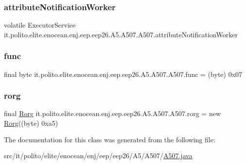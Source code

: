 \subsubsection{\texorpdfstring{attribute\+Notification\+Worker}{attributeNotificationWorker}}
{\footnotesize\ttfamily volatile Executor\+Service it.\+polito.\+elite.\+enocean.\+enj.\+eep.\+eep26.\+A5.\+A507.\+A507.\+attribute\+Notification\+Worker\hspace{0.3cm}{\ttfamily [protected]}}

\hypertarget{classit_1_1polito_1_1elite_1_1enocean_1_1enj_1_1eep_1_1eep26_1_1_a5_1_1_a507_1_1_a507_a2ce5037e955bdc5cf02e51052dd0558d}{}\label{classit_1_1polito_1_1elite_1_1enocean_1_1enj_1_1eep_1_1eep26_1_1_a5_1_1_a507_1_1_a507_a2ce5037e955bdc5cf02e51052dd0558d} 
\subsubsection{\texorpdfstring{func}{func}}
{\footnotesize\ttfamily final byte it.\+polito.\+elite.\+enocean.\+enj.\+eep.\+eep26.\+A5.\+A507.\+A507.\+func = (byte) 0x07\hspace{0.3cm}{\ttfamily [static]}}

\hypertarget{classit_1_1polito_1_1elite_1_1enocean_1_1enj_1_1eep_1_1eep26_1_1_a5_1_1_a507_1_1_a507_a3aa5eb97264c67f46176f7462ef591c0}{}\label{classit_1_1polito_1_1elite_1_1enocean_1_1enj_1_1eep_1_1eep26_1_1_a5_1_1_a507_1_1_a507_a3aa5eb97264c67f46176f7462ef591c0} 
\subsubsection{\texorpdfstring{rorg}{rorg}}
{\footnotesize\ttfamily final \hyperlink{classit_1_1polito_1_1elite_1_1enocean_1_1enj_1_1eep_1_1_rorg}{Rorg} it.\+polito.\+elite.\+enocean.\+enj.\+eep.\+eep26.\+A5.\+A507.\+A507.\+rorg = new \hyperlink{classit_1_1polito_1_1elite_1_1enocean_1_1enj_1_1eep_1_1_rorg}{Rorg}((byte) 0xa5)\hspace{0.3cm}{\ttfamily [static]}}



The documentation for this class was generated from the following file\+:\begin{DoxyCompactItemize}
\item 
src/it/polito/elite/enocean/enj/eep/eep26/\+A5/\+A507/\hyperlink{_a507_8java}{A507.\+java}\end{DoxyCompactItemize}
